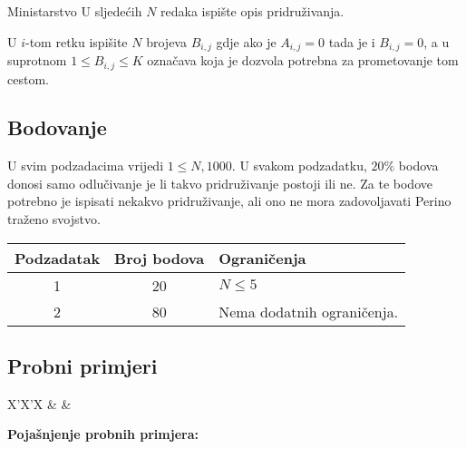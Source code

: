 \begin{statement}[
  problempoints=100,
  timelimit=1 sekunda,
  memorylimit=1024 MiB,
]{Ministarstvo}
U sljedećih $N$ redaka ispište opis pridruživanja.

U $i$-tom retku ispišite $N$ brojeva $B_{i, j}$ gdje ako je $A_{i, j} = 0$ tada je i $B_{i, j} = 0$, a u suprotnom $1 \leq B_{i, j} \leq K$ označava koja je dozvola potrebna za prometovanje tom cestom. 

\subsection*{Bodovanje}

U svim podzadacima vrijedi $1 \leq N, 1000$. U svakom podzadatku, $20\%$ bodova donosi samo odlučivanje je li takvo pridruživanje postoji ili ne. Za te bodove potrebno je ispisati nekakvo pridruživanje, ali ono ne mora zadovoljavati Perino traženo svojstvo. 

{\renewcommand{\arraystretch}{1.4}
  \setlength{\tabcolsep}{6pt}
  \begin{tabular}{ccl}
   Podzadatak & Broj bodova & Ograničenja \\ \midrule
    1 & 20 & $N \leq 5$  \\
    2 & 80 & Nema dodatnih ograničenja. \\
\end{tabular}}

\subsection*{Probni primjeri}
\begin{tabularx}{\textwidth}{X'X'X}
 &
 &
\end{tabularx}

\textbf{Pojašnjenje probnih primjera:}\\


  
\end{statement}


